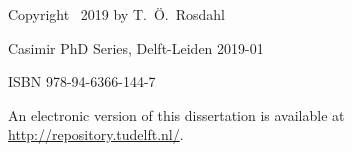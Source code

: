 \begin{titlepage}
\vspace{1\bigskipamount}

\noindent Copyright \textcopyright\ 2019 by T.~{\"O}.~Rosdahl

\medskip
\noindent Casimir PhD Series, Delft-Leiden 2019-01

\medskip
\noindent ISBN 978-94-6366-144-7

\medskip
\noindent An electronic version of this dissertation is available at \\
\url{http://repository.tudelft.nl/}.

\end{titlepage}

